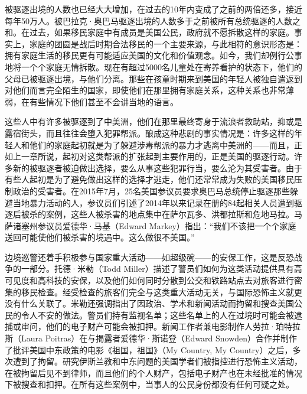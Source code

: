 \documentclass[fontset=fandol, a4paper, 12pt, openright]{ctexbook}
\begin{document}
被驱逐出境的人数也已经大大增加，在过去的10年内变成了之前的两倍还多，接近每年50万人。被巴拉克·奥巴马驱逐出境的人数多于之前被所有总统驱逐的人数之和。在过去，如果移民家庭中有成员是美国公民，政府就不愿拆散这样的家庭。事实上，家庭的团圆是战后时期合法移民的一个主要来源，与此相符的意识形态是：拥有家庭生活的移民更有可能适应美国的文化和价值观念。如今，我们却例行公事地将一个个家庭无情拆散。现在有超过5000名儿童处在寄养看护的状态下，他们的父母已被驱逐出境，与他们分离。那些在孩童时期来到美国的年轻人被独自遣返到对他们而言完全陌生的国家，即使他们在那里拥有家庭关系，这种关系也非常薄弱，在有些情况下他们甚至不会讲当地的语言。

这些人中有许多被驱逐到了中美洲，他们在那里最终寄身于流浪者救助站，抑或是露宿街头，而且往往会堕入犯罪帮派。酿成这种悲剧的事实情况是：许多这样的年轻人和他们的家庭起初就是为了躲避涉毒帮派的暴力才逃离中美洲的——而且，正如上一章所说，起初对这类帮派的扩张起到主要作用的，正是美国的驱逐行动。许多新的被驱逐者被迫做出选择，要么从事这些犯罪行当，要么沦为其受害者。由于有些人起初是为了避免做出这样的选择才逃走，他们还常常成为失败的美国移民压制政治的受害者。在2015年7月，25名美国参议员要求奥巴马总统停止驱逐那些躲避当地暴力活动的人，参议员们引述了2014年以来记录在册的84起相关人员遭到驱逐后被杀的案例，这些人被杀害的地点集中在萨尔瓦多、洪都拉斯和危地马拉。马萨诸塞州参议员爱德华·马基（Edward Markey）指出：“我们不该把一个个家庭送回可能使他们被杀害的境遇中。这么做很不美国。”

边境巡警还着手积极参与国家重大活动——如超级碗——的安保工作，这是反恐战争的一部分。托德·米勒（Todd Miller）描述了警员们如何为这类活动提供具有高可见度和高科技的安保，以及他们如何同时分散到公交和铁路站点去对旅客进行密集的移民检查。经受检查的旅客们完全与这类重大活动无关，与国际恐怖主义就更没有什么关联了。米勒还强调指出了因政治、学术和新闻活动而拘留和搜查美国公民的令人不安的做法。警员们持有监视名单；这些名单上的人在过境时可能会被逮捕或审问，他们的电子财产可能会被扣押。新闻工作者兼电影制作人劳拉·珀特拉斯（Laura Poitras）在与揭露者爱德华·斯诺登（Edward Snowden）合作并制作了批评美国中东政策的电影《祖国，祖国》（My Country, My Country）之后，多次遭到了拘留。研究伊斯兰教和中东问题的美国学者们被指控进行恐怖主义活动，在被拘留后见不到律师，而且他们的个人财产，包括电子财产也在未经批准的情况下被搜查和扣押。在所有这些案例中，当事人的公民身份都没有任何可疑之处。
\end{document}
